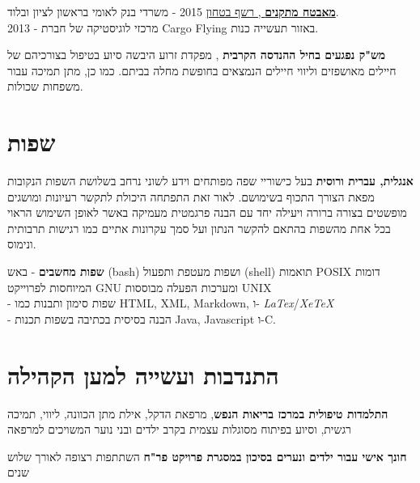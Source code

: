 {\href{https://www.dropbox.com/s/kr5rcui1zgp35i0/recommendation-letter-security-guard.jpg?dl=0}{\textbf{מאבטח מתקנים} , רשף בטחון}} 
{2015 - משרדי בנק לאומי בראשון לציון ובלוד. 
	\\		
	2013 - מרכזי לוגיסטיקה של חברת Cargo Flying באזור תעשייה כנות.}
{}

{\textbf{מש"ק נפגעים בחיל ההנדסה הקרבית} , מפקדת זרוע היבשה}
{סיוע בטיפול בצורכיהם של חיילים מאושפזים וליווי חיילים הנמצאים בחופשת מחלה בביתם. כמו כן, מתן תמיכה עבור משפחות שכולות.}
{}

\section{שפות}

{\textbf{אנגלית, עברית ורוסית}}
{בעל כישוריי שפה מפותחים וידע לשוני נרחב בשלושת השפות הנקובות מפאת הצורך התכוף בשימושם. לאור זאת התפתחה היכולת לתקשר רעיונות ומושגים מופשטים בצורה ברורה ויעילה יחד עם הבנה פרגמטית מעמיקה באשר לאופן השימוש הראוי בכל אחת מהשפות בהתאם להקשר הנתון ועל סמך עקרונות אתיים כמו רגישות תרבותית ונימוס.} 
{}

{\textbf{שפות מחשבים}}
{- באש (bash) ושפות מעטפת ותפעול (shell) תואמות POSIX דומות המיוחסות לפרוייקט GNU ומערכות הפעלה מבוססות UNIX \\ 
	- שפות סימון ותבנות כמו HTML, XML, Markdown, ו-
	\textit{LaTex}/\textit{XeTeX} \\
	- הבנה בסיסית בכתיבה בשפות תכנות Java, Javascript ו-C.}
{}

\section{התנדבות ועשייה למען הקהילה}

{\textbf{התלמדות טיפולית במרכז בריאות הנפש}, מרפאת הדקל, אילת}
{מתן הכוונה, ליווי, תמיכה רגשית, וסיוע בפיתוח מסוגלות עצמית בקרב ילדים ובני נוער המשויכים למרפאה}
{}

{\textbf{חונך אישי עבור ילדים ונערים בסיכון במסגרת פרויקט פר"ח}}
{השתתפות רצופה לאורך שלוש שנים}
{}		
\unsetRTL